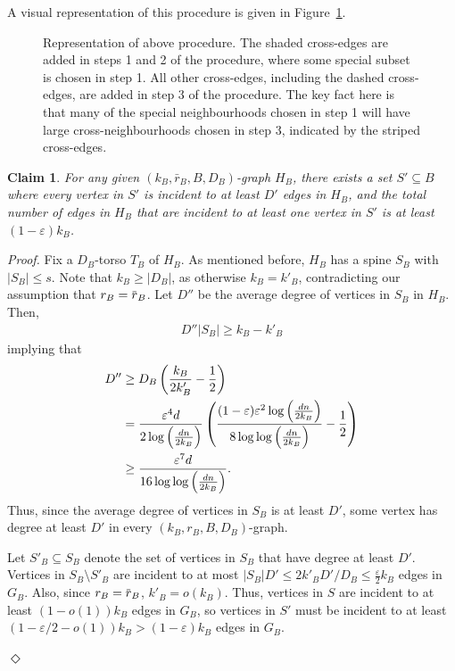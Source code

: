 \documentclass[11pt]{article}
\newenvironment{proofclaim}[1][]%
{\noindent \emph{Proof.} {}{#1}{}}{\hfill
	$\Diamond$\vspace{1em}}
\newcommand{\overbar}[1]{\mkern 1.5mu\overline{\mkern-1.5mu#1\mkern-1.5mu}\mkern 1.5mu}
\theoremstyle{plain}
\newtheorem{claim}{Claim}[thm]
\begin{document}
A visual representation of this procedure is given in Figure~\ref{fig: small torso}.

    \begin{figure}[h]
        \centering{
        \resizebox{0.7\textwidth}{!}{\fontsize{30pt}{30pt}\selectfont%
        }}
        \label{fig: small torso}
        \caption[Procedure for constructing graphs in \cref{lem: Small torso counting small k}]{Representation of above procedure. The shaded cross-edges are added in steps 1 and 2 of the procedure, where some special subset is chosen in step 1. All other cross-edges, including the dashed cross-edges, are added in step 3 of the procedure. The key fact here is that many of the special neighbourhoods chosen in step 1 will have large cross-neighbourhoods chosen in step 3, indicated by the striped cross-edges.}
\end{figure}



\begin{claim}\label{clm: small torso subset}
    For any given $(k_B, \bar r_B, B, D_B)$-graph $H_B$, there exists a set $S' \subseteq B$ where every vertex in $S'$ is incident to at least $D'$ edges in $H_B$, and the total number of edges in $H_B$ that are incident to at least one vertex in $S'$ is at least $(1 - \varepsilon)k_B$.
\end{claim}
\begin{proofclaim}
    Fix a $D_B$-torso $T_B$ of $H_B$. As mentioned before, $H_B$ has a spine $S_B$ with $|S_B| \leq s$. Note that $k_B \geq |D_B|$, as otherwise $k_B = k'_B$, contradicting our assumption that $r_B = \overbar r_B$. Let $D''$ be the average degree of vertices in $S_B$ in $H_B$. Then, 
    \begin{align*}
        D''|S_B| \geq k_B - k'_B
    \end{align*}
    implying that 
    \begin{align}
        D'' &\geq D_{B} \left(\frac{k_B}{2k'_B} - \frac{1}{2}\right) \notag \\
        &= \frac{\varepsilon^4d}{2\log\left(\frac{dn}{2k_B}\right)}\left(\frac{(1 - \varepsilon)\varepsilon^2\log\left(\frac{dn}{2k_B}\right)}{8\log\log\left(\frac{dn}{2k_B}\right)} - \frac{1}{2}\right) \notag \\
        &\geq \frac{\varepsilon^7d}{16\log\log\left(\frac{dn}{2k_B}\right)}.\notag
    \end{align}
    Thus, since the average degree of vertices in $S_B$ is at least $D'$, some vertex has degree at least $D'$ in every $(k_B, r_B, B, D_B)$-graph.
    
    
    Let $S'_B \subseteq S_B$ denote the set of vertices in $S_B$ that have degree at least $D'$. Vertices in $S_B\setminus S'_B$ are incident to at most $|S_B|D' \leq 2k'_BD'/D_B \leq \frac{\varepsilon}{2}k_B $ edges in $G_B$. Also, since $r_B = \overbar r_{B}$, $k'_B=o(k_B)$. Thus, vertices in $S$ are incident to at least $(1 - o(1))k_B$ edges in $G_B$, so vertices in $S'$ must be incident to at least $(1 - \varepsilon/2 - o(1))k_B > (1 - \varepsilon)k_B$ edges in $G_B$.
    
    \end{proofclaim}
\end{document}
